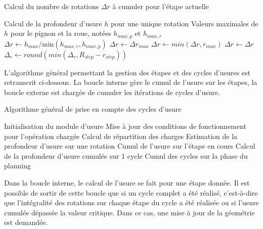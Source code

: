 \begin{algorithm}
\caption{Calcul du nombre de rotations $\Delta r$ à cumuler pour l'étape actuelle}
\label{alg:WM-cumulAMTfr}
  \begin{algorithmic}
    \Require Calcul de la profondeur d'usure $h$ pour une unique rotation
    \Require Valeurs maximales de $h$ pour le pignon et la roue, notées $h_{max,p}$ et $h_{max,r}$
    \State $\Delta r \gets h_{max}/\text{min}(h_{max,r},h_{max,p}) $
        \State $\Delta r \gets \Delta r_{max}$
        \State $\Delta r \gets min(\Delta r, r_{max})$
        \State $\Delta r \gets \Delta r$
      \EndIf
  \State \Return $\Delta_r \gets round(min(\Delta_r, R_{step}-r_{step}))$
  \end{algorithmic}
\end{algorithm}
\FloatBarrier
L'algorithme général permettant la gestion des étapes et des cycles d'usures est retranscrit ci-dessous. La boucle interne gère le cumul de l'usure sur les étapes, la boucle externe est chargée de cumuler les itérations de cycles d'usure.

\begin{algorithm}
\caption{Algorithme général de prise en compte des cycles d'usure}
\label{alg:WM-cumulAMTbeta}
  \begin{algorithmic}
    \State Initialisation du module d'usure
	     \State Mise à jour des conditions de fonctionnement pour l'opération chargée
       \State Calcul de répartition des charges
 	     \State Estimation de la profondeur d'usure sur une rotation
       \State Cumul de l'usure sur l'étape en cours
      \State Calcul de la profondeur d'usure cumulée sur 1 cycle
      \State Cumul des cycles sur la phase du planning
  \end{algorithmic}
\end{algorithm}
\vspace{0.5cm}
\FloatBarrier
Dans la boucle interne, le calcul de l'usure se fait pour une étape donnée. Il est possible de sortir de cette boucle que si un cycle complet a été réalisé, c'est-à-dire que l'intégralité des rotations sur chaque étape du cycle a été réalisée ou si l'usure cumulée dépassée la valeur critique. Dans ce cas, une mise à jour de la géométrie est demandée.

